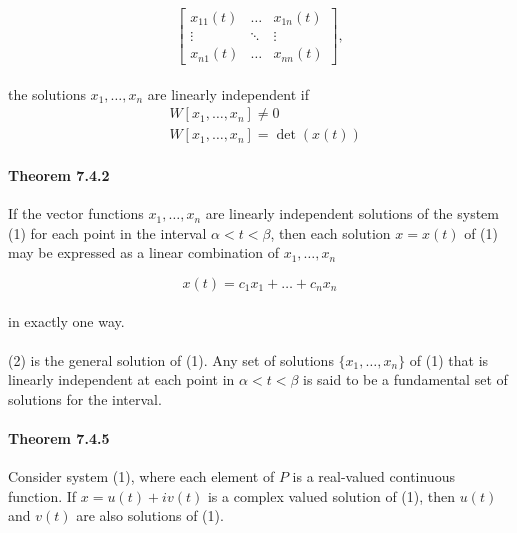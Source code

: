 \documentclass[letterpaper,12pt]{article}
\begin{document}
\[
    \begin{bmatrix}
        x_{11}(t) & \ldots & x_{1n}(t)\\
        \vdots & \ddots & \vdots\\
        x_{n1}(t) & \ldots & x_{nn}(t)
    \end{bmatrix}
,\]
\paragraph{}the solutions $x_1, \ldots, x_n$ are linearly independent if
\begin{align*}
   & W[x_1, \ldots, x_n] \ne 0\\
   & W[x_1, \ldots, x_n] = \det(x(t))
\end{align*}
\paragraph{Theorem 7.4.2} If the vector functions $x_1, \ldots, x_n$ are linearly independent
solutions of the system (1) for each point in the interval $\alpha < t < \beta$, then
each solution $x = x(t)$ of (1) may be expressed as a linear combination of $x_1, \ldots, x_n$

\begin{equation}
    x(t) = c_1x_1 + \ldots + c_nx_n
\end{equation}
\paragraph{}in exactly one way.
\paragraph{}(2) is the general solution of (1). Any set of solutions $\{x_1, \ldots, x_n\}$ of (1)
that is linearly independent at each point in $\alpha < t < \beta$ is said to be 
a fundamental set of solutions for the interval.
\paragraph{Theorem 7.4.5} Consider system (1), where each element of $P$ is a real-valued continuous
function. If $x = u(t) + iv(t)$ is a complex valued solution of (1), then $u(t)$ and $v(t)$ 
are also solutions of (1).
\end{document}
